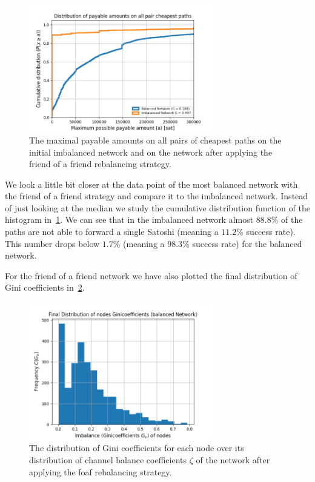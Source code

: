 \documentclass[conference]{IEEEtran}
\begin{document}
\begin{figure}
 \centering
 \includegraphics[width=8cm]{code/vs/fig/maximum_payable_amount_all_pair_chepest_paths_balanced_network.png}
 \caption{The maximal payable amounts on all pairs of cheapest paths on the initial imbalanced network and on the network after applying the friend of a friend rebalancing strategy.}
 \label{fig:cdf_paymentsize}
\end{figure}

We look a little bit closer at the data point of the most balanced network with the friend of a friend strategy and compare it to the imbalanced network.
Instead of just looking at the median we study the cumulative distribution function of the histogram in~\cref{fig:cdf_paymentsize}.
We can see that in the imbalanced network almost $88.8\%$ of the paths are not able to forward a single Satoshi (meaning a $11.2\%$ success rate).
This number drops below $1.7\%$ (meaning a $98.3\%$ success rate) for the balanced network.

For the friend of a friend network we have also plotted the final distribution of Gini coefficients in~\cref{fig:final_gini}. 
\begin{figure}
 \centering
 \includegraphics[width=8cm]{code/vs/fig/Final_ginis_after_rebalancing.png}
 \caption{The distribution of Gini coefficients for each node over its distribution of channel balance coefficients $\zeta$ of the network after applying the foaf rebalancing strategy.}
 \label{fig:final_gini}
\end{figure}
\end{document}
